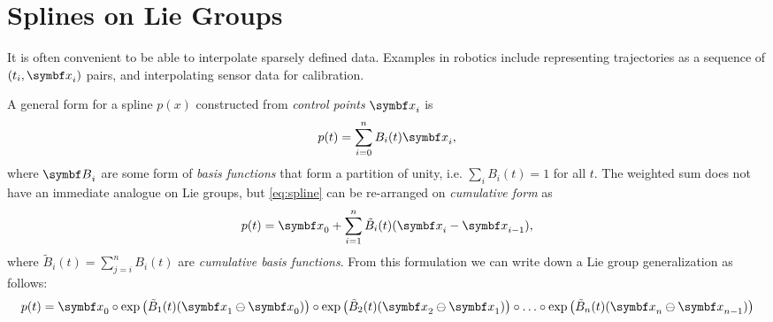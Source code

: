 
\chapter{Splines on Lie Groups}

\begin{figure}[h]
  \begin{center}
  \end{center}
\end{figure}

It is often convenient to be able to interpolate sparsely defined data. Examples in robotics include representing trajectories as a sequence of $(t_{i}, \x_{i})$ pairs, and interpolating sensor data for calibration.

A general form for a spline $p(x)$ constructed from \emph{control points} $\x_{i}$ is
\begin{equation}
  \label{eq:spline}
  p(t) = \sum_{i=0}^{n} B_{i}(t) \x_{i},
\end{equation}
where $\B_{i}$ are some form of \emph{basis functions} that form a partition of unity, i.e. $\sum_{i} B_{i} (t) = 1$ for all $t$. The weighted sum does not have an immediate analogue on Lie groups, but \eqref{eq:spline} can be re-arranged on \emph{cumulative form} as
\begin{equation}
  \label{eq:cum_spline}
  p(t) = \x_{0} + \sum_{i=1}^{n} \tilde B_{i}(t) (\x_{i} - \x_{i-1}),
\end{equation}
where $\tilde B_{i}(t) = \sum_{j=i}^{n} B_{i}(t)$ are \emph{cumulative basis functions}. From this formulation we can write down a Lie group generalization as follows:
\begin{equation}
  \label{eq:cum_spline_liegroup}
  p(t) = \x_{0} \circ \exp \left(\tilde B_{1}(t) (\x_{1} \ominus \x_{0}) \right) \circ \exp \left(\tilde B_{2}(t) (\x_{2} \ominus \x_{1}) \right) \circ \ldots \circ \exp \left(\tilde B_{n}(t) (\x_{n} \ominus \x_{n-1}) \right)
\end{equation}

